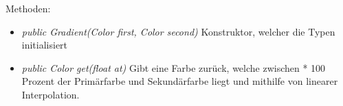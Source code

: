 Methoden:
\begin{itemize} 
    \item \emph{public Gradient(Color first, Color second)} Konstruktor, welcher die Typen initialisiert
    \item \emph{public Color get(float at)} Gibt eine Farbe zurück, welche zwischen * 100 Prozent der Primärfarbe und Sekundärfarbe liegt und mithilfe von linearer Interpolation.
\end{itemize}